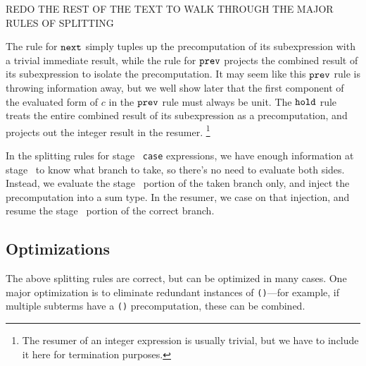 

\TODO REDO THE REST OF THE TEXT TO WALK THROUGH THE MAJOR RULES OF SPLITTING

The rule for ${\tt next}$ simply tuples up the precomputation of its subexpression with a trivial immediate result,
while the rule for ${\tt prev}$ projects the combined result of its subexpression to isolate the precomputation.
It may seem like this ${\tt prev}$ rule is throwing information away, but we well show later that the first component 
of the evaluated form of $c$ in the ${\tt prev}$ rule must always be unit.
The ${\tt hold}$ rule treats the entire combined result of its subexpression as a precomputation, 
and projects out the integer result in the resumer.%
\footnote{The resumer of an integer expression is usually trivial, 
but we have to include it here for termination purposes.}

In the splitting rules for stage \bbone\ {\tt case} expressions, we
have enough information at stage \bbone\ to know what branch to take, so there's
no need to evaluate both sides. Instead, we evaluate the stage \bbone\ portion of the
taken branch only, and inject the precomputation into a sum type. In the
resumer, we case on that injection, and resume the stage \bbtwo\ portion of the
correct branch.



\subsection{Optimizations}

The above splitting rules are correct, but can be optimized in many cases. One
major optimization is to eliminate redundant instances of \texttt{()}---for
example, if multiple subterms have a \texttt{()} precomputation, these can be
combined.

